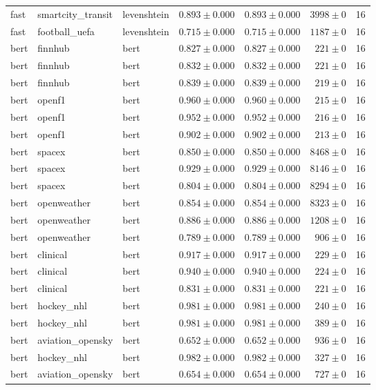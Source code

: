 \begin{table}[htbp]
\begin{tabular}{l l l r r r r}
fast & smartcity\_transit & levenshtein & $0.893\pm0.000$ & $0.893\pm0.000$ & $3998\pm0$ & 16 \\
fast & football\_uefa & levenshtein & $0.715\pm0.000$ & $0.715\pm0.000$ & $1187\pm0$ & 16 \\
bert & finnhub & bert & $0.827\pm0.000$ & $0.827\pm0.000$ & $221\pm0$ & 16 \\
bert & finnhub & bert & $0.832\pm0.000$ & $0.832\pm0.000$ & $221\pm0$ & 16 \\
bert & finnhub & bert & $0.839\pm0.000$ & $0.839\pm0.000$ & $219\pm0$ & 16 \\
bert & openf1 & bert & $0.960\pm0.000$ & $0.960\pm0.000$ & $215\pm0$ & 16 \\
bert & openf1 & bert & $0.952\pm0.000$ & $0.952\pm0.000$ & $216\pm0$ & 16 \\
bert & openf1 & bert & $0.902\pm0.000$ & $0.902\pm0.000$ & $213\pm0$ & 16 \\
bert & spacex & bert & $0.850\pm0.000$ & $0.850\pm0.000$ & $8468\pm0$ & 16 \\
bert & spacex & bert & $0.929\pm0.000$ & $0.929\pm0.000$ & $8146\pm0$ & 16 \\
bert & spacex & bert & $0.804\pm0.000$ & $0.804\pm0.000$ & $8294\pm0$ & 16 \\
bert & openweather & bert & $0.854\pm0.000$ & $0.854\pm0.000$ & $8323\pm0$ & 16 \\
bert & openweather & bert & $0.886\pm0.000$ & $0.886\pm0.000$ & $1208\pm0$ & 16 \\
bert & openweather & bert & $0.789\pm0.000$ & $0.789\pm0.000$ & $906\pm0$ & 16 \\
bert & clinical & bert & $0.917\pm0.000$ & $0.917\pm0.000$ & $229\pm0$ & 16 \\
bert & clinical & bert & $0.940\pm0.000$ & $0.940\pm0.000$ & $224\pm0$ & 16 \\
bert & clinical & bert & $0.831\pm0.000$ & $0.831\pm0.000$ & $221\pm0$ & 16 \\
bert & hockey\_nhl & bert & $0.981\pm0.000$ & $0.981\pm0.000$ & $240\pm0$ & 16 \\
bert & hockey\_nhl & bert & $0.981\pm0.000$ & $0.981\pm0.000$ & $389\pm0$ & 16 \\
bert & aviation\_opensky & bert & $0.652\pm0.000$ & $0.652\pm0.000$ & $936\pm0$ & 16 \\
bert & hockey\_nhl & bert & $0.982\pm0.000$ & $0.982\pm0.000$ & $327\pm0$ & 16 \\
bert & aviation\_opensky & bert & $0.654\pm0.000$ & $0.654\pm0.000$ & $727\pm0$ & 16 \\

\end{tabular}
\end{table}
